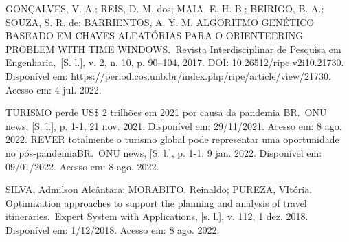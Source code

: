GONÇALVES, V. A.; REIS, D. M. dos; MAIA, E. H. B.; BEIRIGO, B. A.; SOUZA, S. R. de; BARRIENTOS, A. Y. M. ALGORITMO GENÉTICO BASEADO EM CHAVES ALEATÓRIAS PARA O ORIENTEERING PROBLEM WITH TIME WINDOWS. Revista Interdisciplinar de Pesquisa em Engenharia, [S. l.], v. 2, n. 10, p. 90–104, 2017. DOI: 10.26512/ripe.v2i10.21730. Disponível em: https://periodicos.unb.br/index.php/ripe/article/view/21730. Acesso em: 4 jul. 2022.

TURISMO perde US\$ 2 trilhões em 2021 por causa da pandemia BR. ONU news, [S. l.], p. 1-1, 21 nov. 2021. Disponível em: 29/11/2021. Acesso em: 8 ago. 2022.
REVER totalmente o turismo global pode representar uma oportunidade no pós-pandemiaBR. ONU news, [S. l.], p. 1-1, 9 jan. 2022. Disponível em: 09/01/2022. Acesso em: 8 ago. 2022.

SILVA, Admilson Alcântara; MORABITO, Reinaldo; PUREZA, VItória. Optimization approaches to support the planning and analysis of travel itineraries. Expert System with Applications, [s. l.], v. 112, 1 dez. 2018. Disponível em: 1/12/2018. Acesso em: 8 ago. 2022.